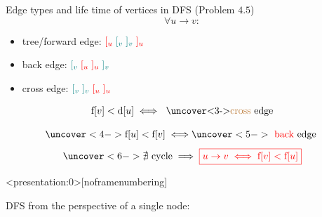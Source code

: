 \begin{frame}{}
  \begin{exampleblock}{Edge types and life time of vertices in DFS (Problem $4.5$)}
    \[
      \forall u \to v:
    \]
    \vspace{-0.30cm}
    \begin{itemize}
      \setlength{\itemsep}{5pt}
      \item tree/forward edge: $\textcolor{red}{[_{u}}\; \textcolor{teal}{[_{v}\; ]_{v}}\; \textcolor{red}{]_{u}}$
      \item back edge: $\textcolor{teal}{[_{v}}\; \textcolor{red}{[_{u}\; ]_{u}}\; \textcolor{teal}{]_{v}}$
      \item cross edge: $\textcolor{teal}{[_{v}\; ]_{v}}\; \textcolor{red}{[_{u}\; ]_{u}}$
    \end{itemize}
  \end{exampleblock}

  \pause
  \[
    \text{f}[v] < \text{d}[u] \iff \text{ \uncover<3->{\brown{cross}} edge}
  \]


  \[
    \uncover<4->{\text{f}[u] < \text{f}[v] \iff } \uncover<5->{\text{ \red{back} edge }}
  \]
  \[
    \uncover<6->{\nexists \text{ cycle} \implies \red{\boxed{u \to v \iff \text{f}[v] < \text{f}[u]}}}
  \]
\end{frame}

\begin{frame}<presentation:0>[noframenumbering]
  \centerline{\large DFS from the perspective of a single node:}
  
  \pause
\end{frame}

